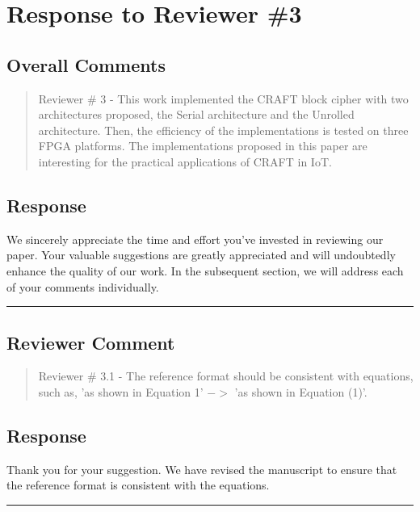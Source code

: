 \section{Response to Reviewer \#3}
\subsection*{Overall Comments}
\begin{mdframed}
	\begin{quote}
		Reviewer \# 3 - This work implemented the CRAFT block cipher with two architectures proposed, the Serial architecture and the Unrolled architecture. Then, the efficiency of the implementations is tested on three FPGA platforms. The implementations proposed in this paper are interesting for the practical applications of CRAFT in IoT.
	\end{quote}
\end{mdframed}

\subsection{Response}

We sincerely appreciate the time and effort you've invested in reviewing our paper. Your valuable suggestions are greatly appreciated and will undoubtedly enhance the quality of our work. In the subsequent section, we will address each of your comments individually.

\noindent\rule{\linewidth}{2.0pt}

\subsection{Reviewer Comment}
\begin{mdframed}
	\begin{quote}
		Reviewer \# 3.1 - The reference format should be consistent with equations, such as, 'as shown in Equation 1' $->$ 'as shown in Equation (1)'.
	\end{quote}
\end{mdframed}

\subsection{Response}

Thank you for your suggestion. We have revised the manuscript to ensure that the reference format is consistent with the equations.


\noindent\rule{\linewidth}{2.0pt}

